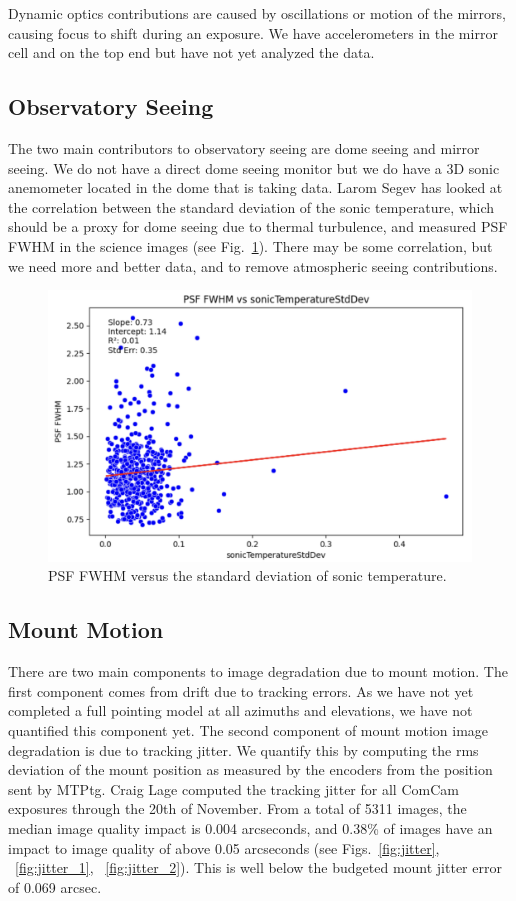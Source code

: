 Dynamic optics contributions are caused by oscillations or motion of the mirrors, causing focus to shift during an exposure. We have accelerometers in the mirror cell and on the top end but have not yet analyzed the data.

\subsection{Observatory Seeing}

The two main contributors to observatory seeing are dome seeing and mirror seeing. We do not have a direct dome seeing monitor but we do have a 3D sonic anemometer located in the dome that is taking data. Larom Segev has looked at the correlation between the standard deviation of the sonic temperature, which should be a proxy for dome seeing due to thermal turbulence, and measured PSF FWHM in the science images (see Fig.~\ref{fig:anemometer}). There may be some correlation, but we need more and better data, and to remove atmospheric seeing contributions.

\begin{figure}
    \includegraphics[width=\linewidth]{image_quality_figures/anemometer_PSF.png}
    \caption{PSF FWHM versus the standard deviation of sonic temperature.}
    \label{fig:anemometer}
\end{figure}

\subsection{Mount Motion}

There are two main components to image degradation due to mount motion. The first component comes from drift due to tracking errors. As we have not yet completed a full pointing model at all azimuths and elevations, we have not quantified this component yet. The second component of mount motion image degradation is due to tracking jitter. We quantify this by computing the rms deviation of the mount position as measured by the encoders from the position sent by MTPtg. Craig Lage computed the tracking jitter for all ComCam exposures through the 20th of November. From a total of 5311 images, the median image quality impact is 0.004 arcseconds, and 0.38\% of images have an impact to image quality of above 0.05 arcseconds (see Figs.~\ref{fig:jitter}, ~\ref{fig:jitter_1}, ~\ref{fig:jitter_2}). This is well below the budgeted mount jitter error of 0.069 arcsec.

